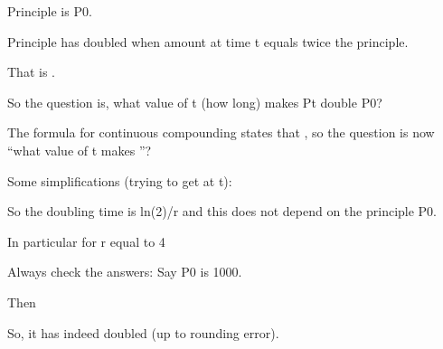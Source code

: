 \documentclass{beamer}
\begin{document}
Principle is P0. 

Principle has doubled when amount at time t equals twice the principle. 

That is . 

So the question is, what value of t (how long) makes Pt double P0? 

The formula for continuous compounding states that , so the question is now ``what value of t makes ''? 

Some simplifications (trying to get at t): 


So the doubling time is ln(2)/r and this does not depend on the principle P0. 

In particular for r equal to 4%

Always check the answers: Say P0 is 1000. 

Then 

So, it has indeed doubled (up to rounding error). 


 
\end{document}
